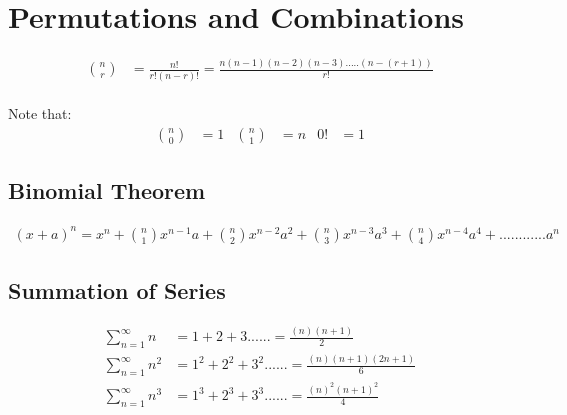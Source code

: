 \section{Permutations and Combinations}
\begin{align}
\binom{n}{r} &= \frac{n!}{r!(n-r)!} = \frac{n(n-1)(n-2)(n-3).....(n-(r+1))}{r!}
\end{align} \\

Note that:
\begin{align*}
\binom{n}{0} &= 1  &  \binom{n}{1} &= n  &  0! &= 1
\end{align*}

\subsection{Binomial Theorem}
\begin{align}
(x+a)^{n} = x^{n} + \binom{n}{1} x^{n-1}a + \binom{n}{2} x^{n-2}a^2 +  \binom{n}{3} x^{n-3}a^3 +  \binom{n}{4} x^{n-4}a^4 + ............ a^n
\end{align}

\subsection{Summation of Series}
\begin{align}
\sum_{n=1}^{\infty} n &= 1+2+3...... = \frac{(n)(n+1)}{2} \\
\sum_{n=1}^{\infty} n^2 &= 1^2+2^2+3^2...... = \frac{(n)(n+1)(2n+1)}{6}\\
\sum_{n=1}^{\infty} n^3 &= 1^3+2^3+3^3...... = \frac{(n)^{2}(n+1)^2}{4}
\end{align}